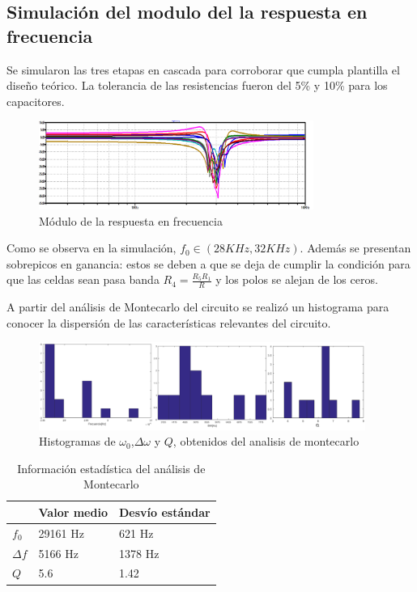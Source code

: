 \documentclass[../../tc_tp5_main.tex]{subfiles}
\begin{document}
\subsection{Simulación del modulo del la respuesta en frecuencia}
Se simularon las tres etapas en cascada para corroborar que cumpla plantilla el diseño te\'orico. La tolerancia de las resistencias fueron del 5\% y 10\% para los capacitores.
\begin{figure}[H]	
	\centering
	\includegraphics[width=0.8\textwidth]{imagenes/montecarlo.png}
	\caption{M\'odulo de la respuesta en frecuencia}
\end{figure}
Como se observa en la simulación, $f_0\in (28KHz,32KHz)$. Adem\'as se presentan sobrepicos en ganancia: estos se deben a que se deja de cumplir la condici\'on para que las celdas sean pasa banda $R_4=\frac{R_5 R_1}{R}$ y los polos se alejan de los ceros.

A partir del análisis de Montecarlo del circuito se realizó un histograma para conocer la dispersión de las características relevantes del circuito.

\begin{figure}[H]	
	\centering
	\includegraphics[width=0.95\textwidth]{imagenes/hist.png}
	\caption{Histogramas de $\omega_0$,$\Delta \omega$ y $Q$, obtenidos del analisis de montecarlo}
\end{figure}

\begin{table}[H]
\begin{center}
\begin{tabular}{|l|l|l|}
\hline
 &Valor medio &Desv\'io estándar\\
\hline \hline

$ f_0$ &29161 Hz &621 Hz  \\ \hline
$\Delta f$ & 5166 Hz&1378 Hz  \\ \hline
$Q$ &5.6 &1.42  \\ \hline

\end{tabular}
\caption{Información estadística del análisis de Montecarlo} 
\end{center}
\end{table}
\end{document}
